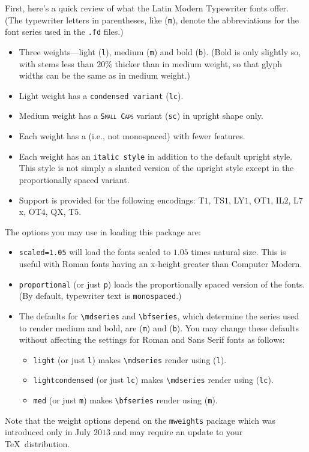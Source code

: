 \documentclass[11pt]{article}
\begin{document}
First, here's a quick review of what the Latin Modern Typewriter fonts offer. (The typewriter letters in parentheses, like ({\tt m}), denote the abbreviations for the font series used in the {\tt.fd} files.)
\begin{itemize}
\item
Three weights---light ({\tt l}), medium ({\tt m}) and bold ({\tt b}). (Bold is only slightly so, with stems less than $20$\% thicker than in medium weight, so that glyph widths can be the same as in medium weight.) 
\item Light weight has a {\tt {}\selectfont condensed variant} ({\tt lc}).
\item Medium weight has a {\tt \textsc{Small Caps}} variant ({\tt sc}) in upright shape only.
\item Each weight has a  (i.e., not monospaced) with fewer features. 
\item Each weight has an {\tt {}\selectfont italic style} in addition to the default upright style. This style is not simply a slanted version of the upright style except in the proportionally spaced variant.
\item Support is provided for the following encodings: T$1$, TS$1$, LY$1$, OT$1$, IL$2$, L$7$x, OT$4$, QX, T$5$.
\end{itemize}
\newpage
The options you may use in loading this package are:
\begin{itemize}
\item {\tt scaled=1.05} will load the fonts scaled to $1.05$ times natural size. This is useful with Roman fonts having an x-height greater than Computer Modern.
\item
{\tt proportional} (or just {\tt p}) loads the proportionally spaced version of the fonts. (By default, typewriter text is {\tt monospaced}.)
\item The defaults for \verb|\mdseries| and \verb|\bfseries|, which determine the series used to render medium and bold, are ({\tt m}) and ({\tt b}). You may change these defaults without affecting the settings for Roman and Sans Serif fonts as follows:
\begin{itemize}
\item
{\tt light} (or just {\tt l}) makes \verb|\mdseries|  render using ({\tt l}).
\item
{\tt lightcondensed} (or just {\tt lc}) makes \verb|\mdseries|  render using ({\tt lc}).
\item
{\tt med} (or just {\tt m}) makes \verb|\bfseries| render using ({\tt m}).
\end{itemize}   
\end{itemize}
Note that the weight options depend on the {\tt mweights} package which was introduced only in July $2013$ and may require an update to your \TeX\ distribution.
\end{document}
